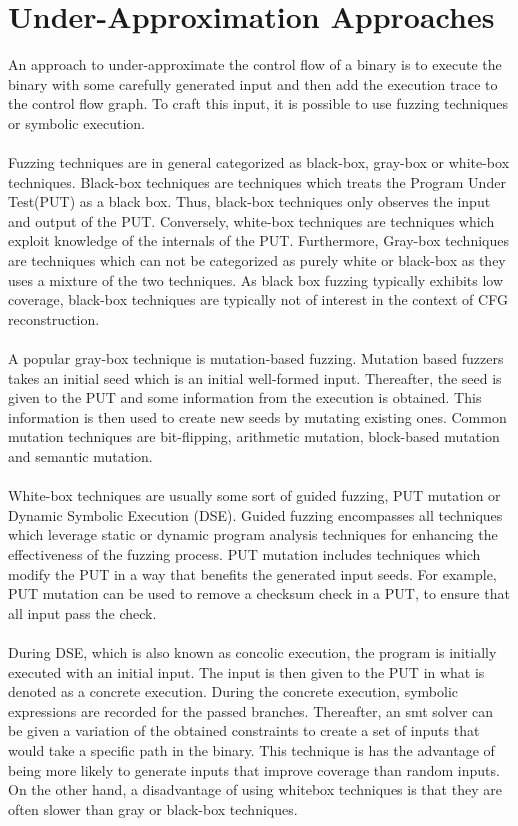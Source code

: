 \documentclass{kththesis}
\begin{document}
\section{Under-Approximation Approaches}
An approach to under-approximate the control flow of a binary is to execute the binary with some carefully generated input and then add the execution trace to the control flow graph. To craft this input, it is possible to use fuzzing techniques or symbolic execution.
\\ \\
Fuzzing techniques are in general categorized as black-box, gray-box or white-box techniques\cite{fuzzingSurvey}. Black-box techniques are techniques which treats the Program Under Test(PUT) as a black box. Thus, black-box techniques only observes the input and output of the PUT. Conversely, white-box techniques are techniques which exploit knowledge of the internals of the PUT. Furthermore, Gray-box techniques are techniques which can not be categorized as purely white or black-box as they uses a mixture of the two techniques. As black box fuzzing typically exhibits low coverage, black-box techniques are typically not of interest in the context of CFG reconstruction\cite{fuzzingSurvey}.
\\ \\
A popular gray-box technique is mutation-based fuzzing. Mutation based fuzzers takes an initial seed which is an initial well-formed input. Thereafter, the seed is given to the PUT and some information from the execution is obtained. This information is then used to create new seeds by mutating existing ones. Common mutation techniques are bit-flipping, arithmetic mutation, block-based mutation and semantic mutation\cite{fuzzingSurvey}.
\\ \\ 
White-box techniques are usually some sort of guided fuzzing, PUT mutation or Dynamic Symbolic Execution (DSE)\cite{fuzzingSurvey}. Guided fuzzing encompasses all techniques which leverage static or dynamic program analysis techniques for enhancing the effectiveness of the fuzzing process. PUT mutation includes techniques which modify the PUT in a way that benefits the generated input seeds. For example, PUT mutation can be used to remove a checksum check in a PUT, to ensure that all input pass the check\cite{fuzzingSurvey}.
\\ \\
During DSE, which is also known as concolic execution, the program is initially executed with an initial input. The input is then given to the PUT in what is denoted as a concrete execution. During the concrete execution, symbolic expressions are recorded for the passed branches. Thereafter, an smt solver can be given a variation of the obtained constraints to create a set of inputs that would take a specific path in the binary. This technique is has the advantage of being more likely to generate inputs that improve coverage than random inputs. On the other hand, a disadvantage of using whitebox techniques is that they are often slower than gray or black-box techniques. 
\end{document}
